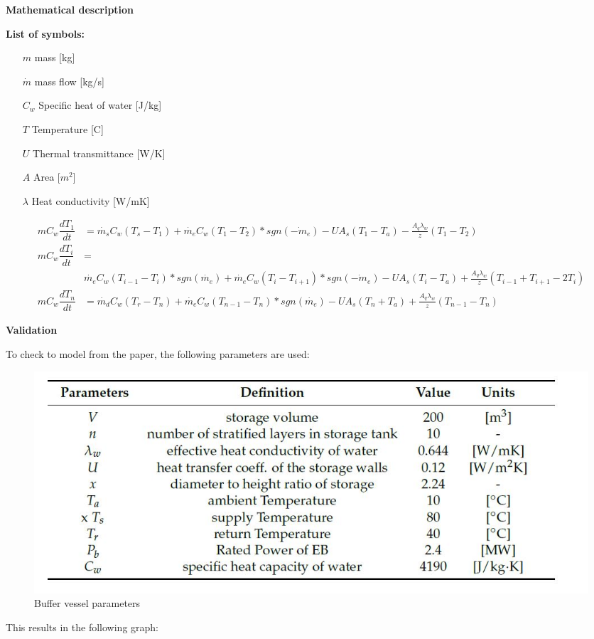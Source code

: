 \textbf{Mathematical description}

\textbf{List of symbols:}

\begin{itemize}
	\item [$m$] {mass [kg]}
	\item [$\dot{m}$] {mass flow [kg/s]}
	\item [$C_w$] {Specific heat of water [J/kg]}
	\item [$T$] {Temperature [C]}
	\item [$U$] {Thermal transmittance [W/K]}
	\item [$A$] {Area [\(m^2\)]}
	\item [$\lambda$] {Heat conductivity [W/mK]}
\end{itemize}

\begin{equation}
	\begin{aligned}
		\label{eq:Buffer vessel layers}
	    mC_w \dfrac{dT_1}{dt} &=
	    \dot{m_s}C_w(T_s - T_1) + \dot{m_e}C_w(T_1 - T_2)*sgn(\dot{-m_e}) - UA_s(T_1 - T_a) - \frac{A_q\lambda_w}{z}(T_1-T_2) \\
	    mC_w \dfrac{dT_i}{dt} &= \\
	    & \dot{m_e}C_w(T_{i-1} - T_{i})*sgn(\dot{m_e}) + \dot{m_e}C_w(T_{i} - T_{i+1})*sgn(\dot{-m_e}) - UA_s(T_i - T_a) + \frac{A_q\lambda_w}{z}(T_{i-1} + T_{i+1} - 2T_i) \\
   	    mC_w \dfrac{dT_n}{dt} &= 
   	    \dot{m_d}C_w(T_r - T_n) + \dot{m_e}C_w(T_{n-1} - T_n)*sgn(\dot{m_e}) - UA_s(T_n + T_a) + \frac{A_q\lambda_w}{z}(T_{n-1}-T_n)		
	\end{aligned}
\end{equation}

\textbf{Validation}

To check to model from the paper, the following parameters are used:

\begin{figure}[h]
	\centering
	\includegraphics[width=0.6\columnwidth]{Figures/parameters_paper.JPG}
	\caption[Short title]{Buffer vessel parameters}
\end{figure}

This results in the following graph:

